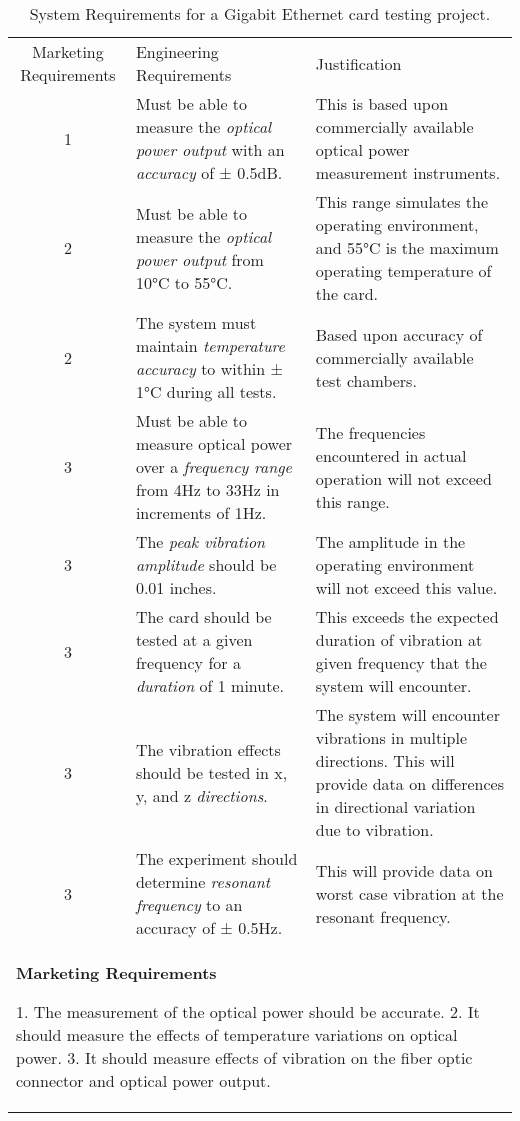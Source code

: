 \begin{table}
\centering
\caption{System Requirements for a Gigabit Ethernet card
testing project.}
\label{table:gigabit}

\begin{tabular}{ |c|l|l|} 
\hline
\rowcolor{Gray}
Marketing Requirements & Engineering Requirements & Justification \\

1 & Must be able to measure the \emph{optical power output} with an
\emph{accuracy} of ± 0.5dB. & This is based upon commercially available
optical power measurement instruments. \\
2 & Must be able to measure the \emph{optical power output} from 10°C to
55°C. & This range simulates the operating environment, and 55°C is the
maximum operating temperature of the card. \\
2 & The system must maintain \emph{temperature accuracy} to within ± 1°C
during all tests. & Based upon accuracy of commercially available test
chambers. \\
3 & Must be able to measure optical power over a \emph{frequency range}
from 4Hz to 33Hz in increments of 1Hz. & The frequencies encountered in
actual operation will not exceed this range. \\
3 & The \emph{peak vibration amplitude} should be 0.01 inches. & The
amplitude in the operating environment will not exceed this value. \\
3 & The card should be tested at a given frequency for a \emph{duration}
of 1 minute. & This exceeds the expected duration of vibration at given
frequency that the system will encounter. \\
3 & The vibration effects should be tested in x, y, and z
\emph{directions}. & The system will encounter vibrations in multiple
directions. This will provide data on differences in directional
variation due to vibration. \\
3 & The experiment should determine \emph{resonant frequency} to an
accuracy of ± 0.5Hz. & This will provide data on worst case vibration at
the resonant frequency. \\

\multicolumn{3}{l}{
\textbf{Marketing Requirements}

1.  The measurement of the optical power should be accurate.
2.  It should measure the effects of temperature variations on optical
  power.
3.  It should measure effects of vibration on the fiber optic connector
  and optical power output.}
\end{tabular}
\end{table}

